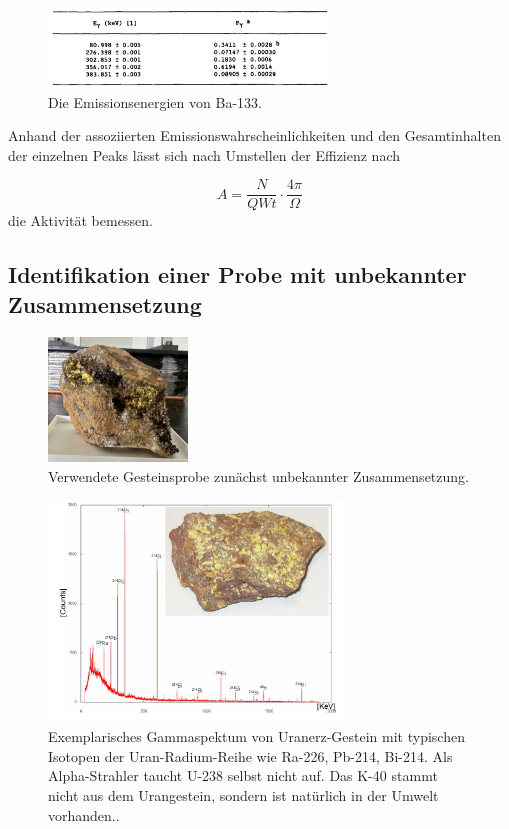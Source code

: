 \begin{figure}[H]
    \centering
    \includegraphics[width=0.666\textwidth]{content/grafik/baenergien.jpg}
    \caption{Die Emissionsenergien von Ba-133. \cite{Kalibration}}
    \label{fig:baE}
\end{figure}

Anhand der assoziierten Emissionswahrscheinlichkeiten und den Gesamtinhalten der einzelnen Peaks lässt sich nach Umstellen
der Effizienz nach

\begin{equation*}
    A = \frac{N}{Q W t} \cdot \frac{4\pi}{\Omega}
\end{equation*}
die Aktivität bemessen.



\subsection{Identifikation einer Probe mit unbekannter Zusammensetzung}

\begin{figure}[H]
    \centering
    \includegraphics[width=0.33\textwidth]{content/grafik/unbekannt.jpg}
    \caption{Verwendete Gesteinsprobe zunächst unbekannter Zusammensetzung.}
    \label{fig:unbekannt}
\end{figure}

\begin{figure}[H]
    \centering
    \includegraphics[width=0.7\textwidth]{content/grafik/Gammaspektrum_Uranerz.jpg}
    \caption{Exemplarisches Gammaspektum von Uranerz-Gestein mit typischen Isotopen der Uran-Radium-Reihe
             wie Ra-226, Pb-214, Bi-214. Als Alpha-Strahler taucht U-238 selbst nicht auf. Das K-40 stammt
             nicht aus dem Urangestein, sondern ist natürlich in der Umwelt vorhanden.. \cite{gamma_uran}}
    \label{fig:SpekU}
\end{figure}

